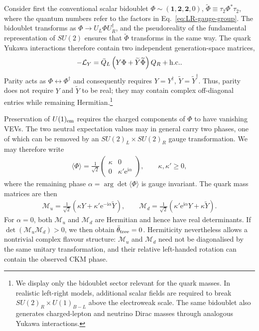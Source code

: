 \documentclass[review]{elsarticle}
\numberwithin{equation}{section}
\numberwithin{table}{section}
\numberwithin{figure}{section}
\def\i{\mathrm{i}}
\def\e{\mathrm{e}}
\def\M{\mathcal{M}}
\def\hc{{\rm h.c.}}
\begin{document}
Consider first the conventional scalar bidoublet $\Phi\sim(\bm{1},\bm{2},\bm{2},0)$, $\widetilde\Phi\equiv\tau_2\Phi^*\tau_2$,
where the quantum numbers refer to the factors in Eq.~\eqref{eq:LR-gauge-group}. The bidoublet transforms as $\Phi\to U_L\Phi U_R^\dagger$, and the pseudoreality of the fundamental representation of $SU(2)$ ensures that $\widetilde\Phi$ transforms in the same way. The quark Yukawa interactions therefore contain two independent generation-space matrices,
\begin{align}
    -\mathcal{L}_Y
    = \bar Q_L \left(Y\Phi + \widetilde Y\widetilde\Phi
    \right) Q_R +\hc .
    \label{eq:LR-bidoublet-Yukawa}
\end{align}
Parity acts as $\Phi\leftrightarrow\Phi^\dagger$ and consequently requires $Y=Y^\dagger$, $\widetilde Y=\widetilde Y^\dagger$.
Thus, parity does not require $Y$ and $\widetilde Y$ to be real; they may contain complex off-diagonal entries while remaining Hermitian.\footnote{We display only the bidoublet sector relevant for the quark masses. In realistic left-right models, additional scalar fields are required to break $SU(2)_R\times U(1)_{B-L}$ above the electroweak scale. The same bidoublet also generates charged-lepton and neutrino Dirac masses through analogous Yukawa interactions.}

Preservation of $U(1)_{\rm em}$ requires the charged components of $\Phi$ to have vanishing VEVs. The two neutral expectation values may in general carry two phases, one of which can be removed by an $SU(2)_L\times SU(2)_R$ gauge transformation. We may therefore write
\begin{align}
    \langle\Phi\rangle
    =
    \frac{1}{\sqrt{2}}
    \begin{pmatrix}
        \kappa & 0\\
        0 & \kappa'\e^{\i\alpha}
    \end{pmatrix},
    \qquad
    \kappa,\kappa'\geq0,
    \label{eq:LR-bidoublet-vev}
\end{align}
where the remaining phase $\alpha=\arg\det\langle\Phi\rangle$ is gauge invariant. The quark mass matrices are then
\begin{align}
    \M_u = \frac{1}{\sqrt{2}} \left(\kappa Y + \kappa'\e^{-\i\alpha}\widetilde Y \right),
    \qquad
    \M_d = \frac{1}{\sqrt{2}} \left( \kappa'\e^{\i\alpha}Y + \kappa\widetilde Y \right).
    \label{eq:LR-quark-mass-bidoublet}
\end{align}
For $\alpha=0$, both $\M_u$ and $\M_d$ are Hermitian and hence have real determinants. If $\det(\M_u\M_d)>0$, we then obtain $\bar\theta_{\rm tree}=0$. Hermiticity nevertheless allows a nontrivial complex flavour structure: $\M_u$ and $\M_d$ need not be diagonalised by the same unitary transformation, and their relative left-handed rotation can contain the observed CKM phase.
\end{document}
